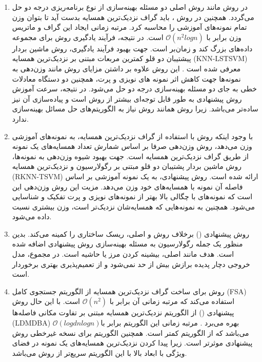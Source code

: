 \begin{enumerate}
	\item 	در روش  مانند روش  اصلی دو مسئله بهینه‌سازی از نوع برنامه‌ریزی درجه دو حل می‌گردد. همچنین در روش ، باید گراف نزدیک‌ترین همسایه بدست آید تا بتوان وزن تمام نمونه‌های آموزشی را محاسبه کرد. مرتبه زمانی ایجاد این گراف و ماتریس وزن برابر با $\mathcal{O}(n^{2}logn)$ است. در نتیجه، فرآیند یادگیری روش   برای مجموعه داده‌های بزرگ کند و زمان‌بر است. جهت بهبود فرآیند یادگیری، روش ماشین بردار پیشتیبان دو قلو کمترین مربعات مبتنی بر نزدیک‌ترین همسایه (\gls{KNN-LSTSVM}) معرفی شده است \cite{mir2018}. این روش علاوه بر داشتن مزایای روش  مانند وزن‌دهی به نمونه‌ها جهت کاهش اثر نمونه های نویزی و پرت، همچنین دو دستگاه معادلات خطی به جای دو مسئله بهینه‌سازی درجه دو حل می‌شود. در نتیجه، سرعت آموزش روش پیشنهادی به طور قابل توجه‌ای بیشتر از روش  است و پیاده‌سازی آن نیز ساده‌تر می‌باشد. زیرا روش  همانند روش   نیاز به الگوریتم‌های حل مسائل بهینه‌سازی ندارد.
	\item با وجود اینکه روش  با استفاده از گراف نزدیک‌ترین همسایه، به نمونه‌های آموزشی وزن می‌دهد، روش وزن‌دهی صرفا بر اساس شمارش تعداد همسایه‌های یک نمونه از طریق گراف نزدیک‌ترین همسایه است.  جهت بهبود شیوه وزن‌دهی به نمونه‌ها، روش ماشین بردار پشتیبان دو قلو مبتنی بر رگولارسیون و نزدیک‌ترین همسایه  (\gls{RKNN-TSVM}) ارائه شده است. روش پیشنهادی، به یک نمونه آموزشی بر اساس فاصله آن نمونه با همسایه‌های خود وزن می‌دهد. مزیت این روش وزن‌دهی این است که نمونه‌های با چگالی بالا بهتر از نمونه‌های نویزی و پرت تفکیک و شناسایی می‌شود. همچنین به نمونه‌هایی که همسایه‌شان نزدیک‌تر است، وزن بیشتری نسبت داده می‌شود.
	\item روش پیشنهادی () برخلاف روش  و  اصلی، ریسک ساختاری را کمینه می‌کند. بدین منظور یک جمله رگولارسیون به مسئله بهینه‌سازی روش پیشنهادی اضافه شده است. هدف مانند  اصلی، بیشینه کردن مرز یا حاشیه است. در مجموع، مدل خروجی دچار پدیده برازش بیش از حد نمی‌شود و از تعمیم‌پذیری بهتری برخوردار است.
	\item	روش  برای ساخت گراف نزدیک‌ترین همسایه از الگوریتم جستجوی کامل  (\gls{FSA}) استفاده می‌کند که مرتبه زمانی آن برابر با $\mathcal{O}(n^{2})$ است. با این حال روش پیشنهادی () از الگوریتم نزدیک‌ترین همسایه مبتنی بر تفاوت مکانی فاصله‌ها (\gls{LDMDBA}) بهره می‌برد \cite{xia2015}. مرتبه زمانی این الگوریتم برابر با$\mathcal{O}(log d n log n)$  می‌باشد که از الگوریتم  کمتر است. همچنین الگوریتم  برای نسخه غیرخطی روش پیشنهادی موثرتر است. زیرا پیدا کردن نزدیک‌ترین همسایه‌های یک نمونه در فضای ویژگی با ابعاد بالا با این الگوریتم سریع‌تر از روش  می‌باشد.
\end{enumerate}

